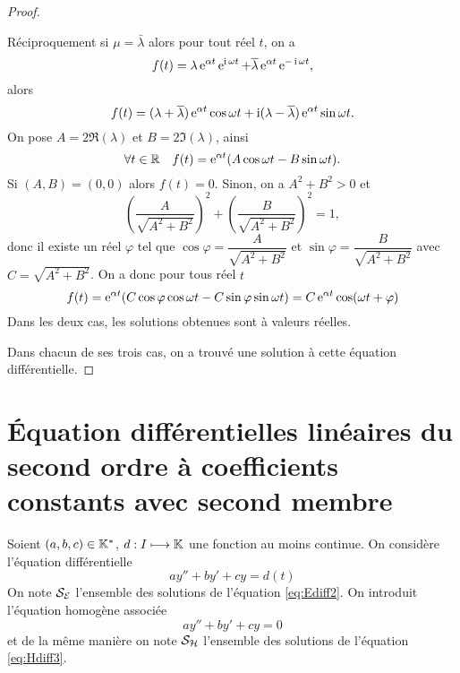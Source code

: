 \begin{proof}
\begin{itemize}
Réciproquement si \(\mu=\bar{\lambda}\) alors pour tout réel \(t\), on a
\begin{equation}
 f(t)=\lambda \operatorname{e}^{\alpha t} \operatorname{e}^{\operatorname{i} \omega t} + \overline{\lambda} \operatorname{e}^{\alpha t} \operatorname{e}^{-\operatorname{i}\omega t}, 
\end{equation}
alors
\begin{equation}
 f(t)=(\lambda + \overline{\lambda}) \operatorname{e}^{\alpha t} \cos \omega t + \operatorname{i}(\lambda - \overline{\lambda}) \operatorname{e}^{\alpha t}\sin \omega t. 
\end{equation}
On pose \(A=2 \Re(\lambda)\) et  \(B=2\Im(\lambda)\), ainsi
\begin{equation}
  \forall t \in \mathbb{R} \quad f(t)=\operatorname{e}^{\alpha t} (A \cos \omega t -B \sin \omega t).
\end{equation}
Si \((A,B)=(0,0)\) alors \(f(t)=0\). Sinon, on a \(A^2+B^2>0\) et 
\begin{equation}
\left(\dfrac{A}{\sqrt{A^2+B^2}} \right)^2+\left(\dfrac{B}{\sqrt{A^2+B^2}} \right)^2=1,
\end{equation}
donc il existe un réel \(\varphi\) tel que \(\cos \varphi=\dfrac{A}{\sqrt{A^2+B^2}}\) et \(\sin \varphi = \dfrac{B}{\sqrt{A^2+B^2}}\) avec \(C=\sqrt{A^2+B^2}\). On a donc pour tous réel \(t\) 
\begin{equation}
f(t)=\operatorname{e}^{\alpha t} (C \cos \varphi \cos \omega t - C \sin \varphi \sin \omega t) = C \operatorname{e}^{\alpha t} \cos(\omega t + \varphi)
\end{equation}
 Dans les deux cas, les solutions obtenues sont à valeurs réelles.
  \end{itemize}
Dans chacun de ses trois cas, on a trouvé une solution à cette équation différentielle.
\end{proof}
%
\section{Équation différentielles linéaires du second ordre à coefficients constants avec second membre}
\label{sec:eqdifflinsecondordrecoefconstantsecondmembre}
Soient \((a,b,c) \in \mathbb{K}^{*}\), \(d:I \longmapsto \mathbb{K}\) une fonction au moins continue. On considère l'équation différentielle
\begin{equation}
  \label{eq:Ediff2}
  ay'' + by' + cy=d(t)
\end{equation}
On note \(\mathcal{S}_{\mathcal{E}}\) l'ensemble des solutions de l'équation \eqref{eq:Ediff2}. On introduit l'équation homogène associée
\begin{equation}
  \label{eq:Hdiff3}
  ay''+by'+cy=0
\end{equation}
et de la même manière on note \(\mathcal{S}_{\mathcal{H}}\) l'ensemble des solutions de l'équation \eqref{eq:Hdiff3}.
